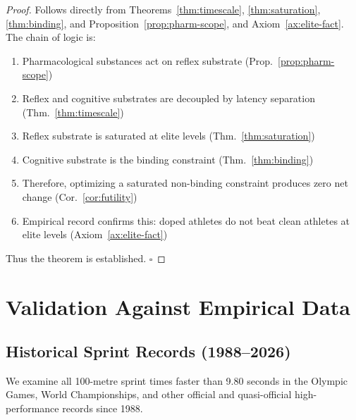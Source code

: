 \documentclass[11pt,twocolumn]{article}
\theoremstyle{definition}
\theoremstyle{remark}
\begin{document}
\begin{proof}
Follows directly from Theorems~\ref{thm:timescale}, \ref{thm:saturation}, \ref{thm:binding}, and Proposition~\ref{prop:pharm-scope}, and Axiom~\ref{ax:elite-fact}. The chain of logic is:

\begin{enumerate}[leftmargin=1.2em]
\item Pharmacological substances act on reflex substrate (Prop.~\ref{prop:pharm-scope})
\item Reflex and cognitive substrates are decoupled by latency separation (Thm.~\ref{thm:timescale})
\item Reflex substrate is saturated at elite levels (Thm.~\ref{thm:saturation})
\item Cognitive substrate is the binding constraint (Thm.~\ref{thm:binding})
\item Therefore, optimizing a saturated non-binding constraint produces zero net change (Cor.~\ref{cor:futility})
\item Empirical record confirms this: doped athletes do not beat clean athletes at elite levels (Axiom~\ref{ax:elite-fact})
\end{enumerate}

Thus the theorem is established. $\square$
\end{proof}

\section{Validation Against Empirical Data}
\label{sec:validation}

\subsection{Historical Sprint Records (1988--2026)}

We examine all 100-metre sprint times faster than 9.80 seconds in the Olympic Games, World Championships, and other official and quasi-official high-performance records since 1988.
\end{document}
